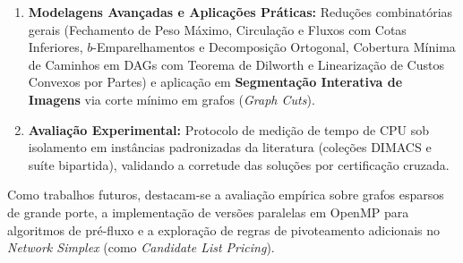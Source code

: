 \begin{enumerate}[leftmargin=1.5em, itemsep=0.4em]
    \item \textbf{Modelagens Avançadas e Aplicações Práticas:} Reduções combinatórias gerais (Fechamento de Peso Máximo, Circulação e Fluxos com Cotas Inferiores, $b$-Emparelhamentos e Decomposição Ortogonal, Cobertura Mínima de Caminhos em DAGs com Teorema de Dilworth e Linearização de Custos Convexos por Partes) e aplicação em \textbf{Segmentação Interativa de Imagens} via corte mínimo em grafos (\textit{Graph Cuts}).

    \item \textbf{Avaliação Experimental:} Protocolo de medição de tempo de CPU sob isolamento em instâncias padronizadas da literatura (coleções DIMACS e suíte bipartida), validando a corretude das soluções por certificação cruzada.
\end{enumerate}

Como trabalhos futuros, destacam-se a avaliação empírica sobre grafos esparsos de grande porte, a implementação de versões paralelas em OpenMP para algoritmos de pré-fluxo e a exploração de regras de pivoteamento adicionais no \textit{Network Simplex} (como \textit{Candidate List Pricing}).



